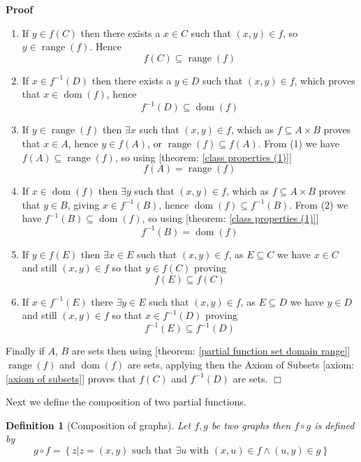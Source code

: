 \documentclass{book}
\newcommand{\tmop}[1]{\ensuremath{\operatorname{#1}}}
\newenvironment{proof}{\noindent\textbf{Proof\ }}{\hspace*{\fill}$\Box$\medskip}
\newtheorem{definition}{Definition}
{\theorembodyfont{\rmfamily}\newtheorem{example}{Example}}
\begin{document}
\begin{proof}
  
  \begin{enumerate}
    \item If $y \in f (C)$ then there exists a $x \in C$ such that $(x, y) \in
    f$, so $y \in \tmop{range} (f)$. Hence
    \[ f (C) \subseteq \tmop{range} (f) \]
    \item If $x \in f^{- 1} (D)$ then there exists a $y \in D$ such that $(x,
    y) \in f$, which proves that $x \in \tmop{dom} (f)$, hence
    \[ f^{- 1} (D) \subseteq \tmop{dom} (f) \]
    \item If $y \in \tmop{range} (f)$ then $\exists x$ such that $(x, y) \in
    f$, which as $f \subseteq A \times B$ proves that $x \in A$, hence $y \in
    f (A)$, or $\tmop{range} (f) \subseteq f (A)$. From (1) we have $f (A)
    \subseteq \tmop{range} (f)$, so using [theorem: \ref{class properties
    (1)}]
    \[ f (A) = \tmop{range} (f) \]
    \item If $x \in \tmop{dom} (f)$ then $\exists y$ such that $(x, y) \in f$,
    which as $f \subseteq A \times B$ proves that $y \in B$, giving $x \in
    f^{- 1} (B)$, hence $\tmop{dom} (f) \subseteq f^{- 1} (B)$. From (2) we
    have $f^{- 1} (B) \subseteq \tmop{dom} (f)$, so using [theorem: \ref{class
    properties (1)}]
    \[ f^{- 1} (B) = \tmop{dom} (f) \]
    \item If $y \in f (E)$ then $\exists x \in E$ such that $(x, y) \in f$, as
    $E \subseteq C$ we have $x \in C$ and still $(x, y) \in f$ so that $y \in
    f (C)$ proving
    \[ f (E) \subseteq f (C) \]
    \item If $x \in f^{- 1} (E)$ there $\exists y \in E$ such that $(x, y) \in
    f$, as $E \subseteq D$ we have $y \in D$ and still $(x, y) \in f$ so that
    $x \in f^{- 1} (D)$ proving
    \[ f^{- 1} (E) \subseteq f^{- 1} (D) \]
  \end{enumerate}
  Finally if $A$, $B$ are sets then using [theorem: \ref{partial function set
  domain range}] $\tmop{range} (f)$ and $\tmop{dom} (f)$ are sets, applying
  then the Axiom of Subsets [axiom: \ref{axiom of subsets}] proves that $f
  (C)$ and $f^{- 1} (D)$ are sets.
\end{proof}

Next we define the composition of two partial functions.

\begin{definition}[Composition of graphs]
  \label{partial function composition of graphs}{}Let $f,
  g$ be two graphs then $f \circ g$ is defined by
  \[ g \circ f = \left\{ z|z = (x, y) \text{ such that $\exists u \text{ with
     $(x, u) \in f \wedge (u, y) \in g$}$} \right\} \]
\end{definition}
\end{document}
